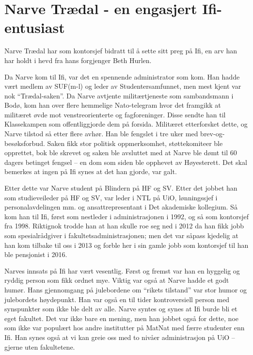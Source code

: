 \chapter{Narve Trædal - en engasjert Ifi-entusiast}

\author{Skrevet av Dag Langmyhr og Arne Maus}

Narve Trædal har som kontorsjef bidratt til å sette sitt preg på Ifi, en arv han har holdt i hevd fra hans forgjenger Beth Hurlen.

Da Narve kom til Ifi, var det en spennende administrator som kom. Han hadde vært medlem av SUF(m-l) og leder av Studentersamfunnet, men mest kjent var nok ``Trædal-saken''. Da Narve avtjente militærtjeneste som sambandsmann i Bodø, kom han over flere hemmelige Nato-telegram hvor det framgikk at militæret øvde mot venstreorienterte og fagforeninger. Disse sendte han til Klassekampen som offentliggjorde dem på forsida. Militæret etterforsket dette, og Narve tilstod så etter flere avhør. Han ble fengslet i tre uker med brev-og-besøksforbud. Saken fikk stor politisk oppmerksomhet, støttekomiteer ble opprettet, bok ble skrevet og saken ble avsluttet med at Narve ble dømt til 60 dagers betinget fengsel – en dom som siden ble opphevet av Høyesterett. Det skal bemerkes at ingen på Ifi synes at det han gjorde, var galt.

Etter dette var Narve student på Blindern på HF og SV. Etter det jobbet han som studieveileder på HF og SV, var leder i NTL på UiO, lønningssjef i personalavdelingen mm. og ansattrepresentant i Det akademiske kollegium. Så kom han til Ifi, først som nestleder i administrasjonen i 1992, og så som kontorsjef fra 1998. Riktignok trodde han at han skulle roe seg ned i 2012 da han fikk jobb som spesialrådgiver i fakultetsadministrasjonen; men det var såpass kjedelig at han kom tilbake til oss i 2013 og forble her i sin gamle jobb som kontorsjef til han ble pensjonist i 2016.

Narves innsats på Ifi har vært vesentlig. Først og fremst var han en hyggelig og ryddig person som fikk ordnet mye. Viktig var også at Narve hadde et godt humør. Hans gjennomgang på julebordene om ``rikets tilstand'' var stor humor og julebordets høydepunkt. Han var også en til tider kontroversiell person med synspunkter som ikke ble delt av alle. Narve syntes og synes at Ifi burde bli et eget fakultet. Det var ikke bare en mening, men han jobbet også for dette, noe som ikke var populært hos andre institutter på MatNat med færre studenter enn Ifi. Han synes også at vi kan greie oss med to nivåer administrasjon på UiO – gjerne uten fakultetene. 

